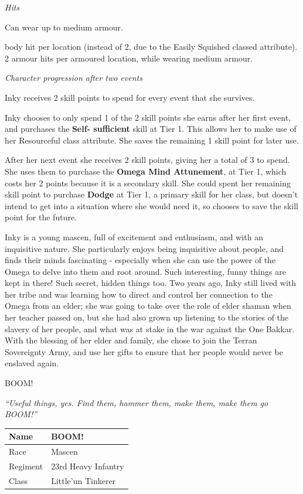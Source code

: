 \textit{Hits}

Can wear up to medium armour.

body hit per location (instead of 2, due to the Easily Squished classed attribute). 2 armour hits per armoured location, while wearing medium armour.

\textit{Character progression after two events}

Inky receives 2 skill points to spend for every event that she survives.

Inky chooses to only spend 1 of the 2 skill points she earns after her first event, and purchases the \textbf{Self- sufficient} skill at Tier 1. This allows her to make use of her Resourceful class attribute. She saves the remaining 1 skill point for later use.

After her next event she receives 2 skill points, giving her a total of 3 to spend. She uses them to purchase the \textbf{Omega Mind Attunement}, at Tier 1, which costs her 2 points because it is a secondary skill. She could spent her remaining skill point to purchase \textbf{Dodge} at Tier 1, a primary skill for her class, but doesn't intend to get into a situation where she would need it, so chooses to save the skill point for the future.

Inky is a young mascen, full of excitement and enthusiasm, and with an inquisitive nature. She particularly enjoys being inquisitive about people, and finds their minds fascinating - especially when she can use the power of the Omega to delve into them and root around. Such interesting, funny things are kept in there! Such secret, hidden things too. Two years ago, Inky still lived with her tribe and was learning how to direct and control her connection to the Omega from an elder; she was going to take over the role of elder shaman when her teacher passed on, but she had also grown up listening to the stories of the slavery of her people, and what was at stake in the war against the One Bakkar. With the blessing of her elder and family, she chose to join the Terran Sovereignty Army, and use her gifts to ensure that her people would never be enslaved again.

BOOM!

\textit{``Useful things, yes. Find them, hammer them, make them, make them go BOOM!''}

\begin{table}
\begin{tabular}{|l|l|} \hline 
Name & BOOM! \\
 \hline Race & Mascen \\
 \hline Regiment & 23rd Heavy Infantry \\
 \hline Class & Little'un Tinkerer \\
 \hline \end{tabular}

\end{table}

